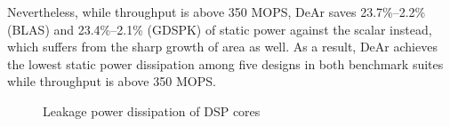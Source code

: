 {    Nevertheless, while throughput is above 350 MOPS, DeAr saves 23.7\%--2.2\% (BLAS) and 23.4\%--2.1\% (GDSPK) of static power against the scalar instead, 
    which suffers from the sharp growth of area as well.
    As a result, DeAr achieves the lowest static power dissipation among five designs in both benchmark suites while throughput is above 350 MOPS.
    \vspace{\textfig}
    \begin{figure}[t]
        \begin{center}
        \end{center}
        \caption{Leakage power dissipation of DSP cores}
        \label{chart:leakage}
    \end{figure}
}


